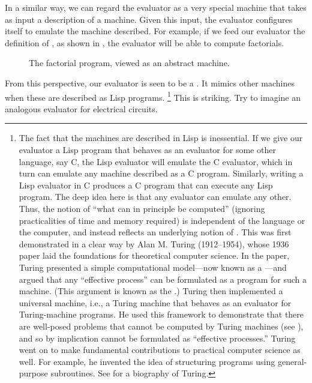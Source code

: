 In a similar way, we can regard the evaluator as a very special machine that takes as input a description of a machine.
Given this input, the evaluator configures itself to emulate the machine described.
For example, if we feed our evaluator the definition of , as shown in , the evaluator will be able to compute factorials.

\begin{figure}[tb]
	\centering
	
	\caption{
		The factorial program, viewed as an abstract machine.
	}
	\label{Figure 4.2}
\end{figure}

From this perspective, our evaluator is seen to be a .
It mimics other machines when these are described as Lisp programs.%
\footnote{
	The fact that the machines are described in Lisp is inessential.
	If we give our evaluator a Lisp program that behaves as an evaluator for some other language, say C, the Lisp evaluator will emulate the C evaluator, which in turn can emulate any machine described as a C program.
	Similarly, writing a Lisp evaluator in C produces a C program that can execute any Lisp program.
	The deep idea here is that any evaluator can emulate any other.
	Thus, the notion of “what can in principle be computed” (ignoring practicalities of time and memory required) is independent of the language or the computer, and instead reflects an underlying notion of .
	This was first demonstrated in a clear way by Alan M.
	Turing (1912--1954), whose 1936 paper laid the foundations for theoretical computer science.
	In the paper, Turing presented a simple computational model---now known as a ---and argued that any “effective process” can be formulated as a program for such a machine.
	(This argument is known as the .)
	Turing then implemented a universal machine, i.e., a Turing machine that behaves as an evaluator for Turing-machine programs.
	He used this framework to demonstrate that there are well-posed problems that cannot be computed by Turing machines (see ), and so by implication cannot be formulated as “effective processes.”
	Turing went on to make fundamental contributions to practical computer science as well.
	For example, he invented the idea of structuring programs using general-purpose subroutines.
	See  for a biography of Turing.
}
This is striking.
Try to imagine an analogous evaluator for electrical circuits.
